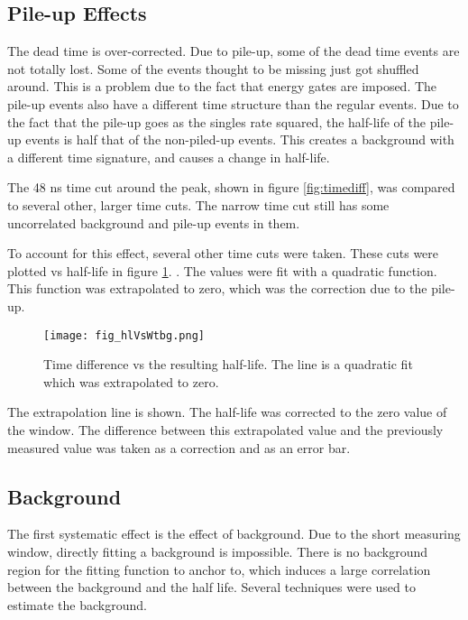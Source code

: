 \documentclass[MaxHughesThesis.tex]{subfiles}
\begin{document}
\subsection{Pile-up Effects}
The dead time is over-corrected. 
Due to pile-up, some of the dead time events are not totally lost.
Some of the events thought to be missing just got shuffled around.
This is a problem due to the fact that energy gates are imposed.
The pile-up events also have a different time structure than the regular events.
Due to the fact that the pile-up goes as the singles rate squared, the half-life of the pile-up events is half that of the non-piled-up events.
This creates a background with a different time signature, and causes a change in half-life.

The 48 ns time cut around the peak, shown in figure \ref{fig:timediff}, was compared to several other, larger time cuts.
The narrow time cut still has some uncorrelated background and pile-up events in them.


To account for this effect, several other time cuts were taken.
These cuts were plotted vs half-life in figure \ref{fig:timediffvhl}. .
The values were fit with a quadratic function.
This function was extrapolated to zero, which was the correction due to the pile-up.
 

\begin{figure}[!htb]
\centerline{\texttt{[image: fig\_hlVsWtbg.png]}}
\caption{Time difference vs the resulting half-life.
	 The line is a quadratic fit which was extrapolated to zero.
	}
\label{fig:timediffvhl}
\end{figure}
 
The extrapolation line is shown.
The half-life was corrected to the zero value of the window.
The difference between this extrapolated value and the previously measured value was taken as a correction and as an error bar.
 
\subsection{Background}

The first systematic effect is the effect of background.
Due to the short measuring window, directly fitting a background is impossible.
There is no background region for the fitting function to anchor to, which induces a large correlation between the background and the half life.
Several techniques were used to estimate the background.
\end{document}

